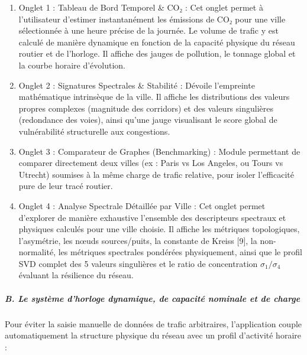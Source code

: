 \documentclass[10pt, a4paper]{article}
\providecommand{\tightlist}{}
\begin{document}
\begin{enumerate}
\def\labelenumi{\arabic{enumi}.}
\tightlist
\item
  Onglet 1 : Tableau de Bord Temporel \& CO₂ : Cet onglet permet à
  l'utilisateur d'estimer instantanément les émissions de CO₂ pour une
  ville sélectionnée à une heure précise de la journée. Le volume de
  trafic y est calculé de manière dynamique en fonction de la capacité
  physique du réseau routier et de l'horloge. Il affiche des jauges de
  pollution, le tonnage global et la courbe horaire d'évolution.
\item
  Onglet 2 : Signatures Spectrales \& Stabilité : Dévoile l'empreinte
  mathématique intrinsèque de la ville. Il affiche les distributions des
  valeurs propres complexes (magnitude des corridors) et des valeurs
  singulières (redondance des voies), ainsi qu'une jauge visualisant le
  score global de vulnérabilité structurelle aux congestions.
\item
  Onglet 3 : Comparateur de Graphes (Benchmarking) : Module permettant
  de comparer directement deux villes (ex : Paris vs Los Angeles, ou
  Tours vs Utrecht) soumises à la même charge de trafic relative, pour
  isoler l'efficacité pure de leur tracé routier.
\item
  Onglet 4 : Analyse Spectrale Détaillée par Ville : Cet onglet permet
  d'explorer de manière exhaustive l'ensemble des descripteurs spectraux
  et physiques calculés pour une ville choisie. Il affiche les métriques
  topologiques, l'asymétrie, les nœuds sources/puits, la constante de
  Kreiss {[}9{]}, la non-normalité, les métriques spectrales pondérées
  physiquement, ainsi que le profil SVD complet des 5 valeurs
  singulières et le ratio de concentration \(\sigma_1 / \sigma_4\)
  évaluant la résilience du réseau.
\end{enumerate}

\subparagraph{B. Le système d'horloge dynamique, de capacité nominale et
de
charge}\label{b.-le-systuxe8me-dhorloge-dynamique-de-capacituxe9-nominale-et-de-charge}

Pour éviter la saisie manuelle de données de trafic arbitraires,
l'application couple automatiquement la structure physique du réseau
avec un profil d'activité horaire :
\end{document}
